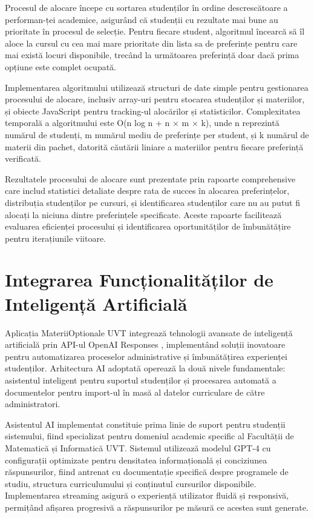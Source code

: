 \documentclass[12pt,a4paper]{report}
\begin{document}
Procesul de alocare începe cu sortarea studenților în ordine descrescătoare a performan-ței academice, asigurând că studenții cu rezultate mai bune au prioritate în procesul de selecție. Pentru fiecare student, algoritmul încearcă să îl aloce la cursul cu cea mai mare prioritate din lista sa de preferințe pentru care mai există locuri disponibile, trecând la următoarea preferință doar dacă prima opțiune este complet ocupată.

Implementarea algoritmului utilizează structuri de date simple \cite{data-structures} pentru gestionarea procesului de alocare, inclusiv array-uri pentru stocarea studenților și materiilor, și obiecte JavaScript pentru tracking-ul alocărilor și statisticilor. Complexitatea temporală a algoritmului este O(n log n + n × m × k), unde n reprezintă numărul de studenți, m numărul mediu de preferințe per student, și k numărul de materii din pachet, datorită căutării liniare a materiilor pentru fiecare preferință verificată.

Rezultatele procesului de alocare sunt prezentate prin rapoarte comprehensive care includ statistici detaliate despre rata de succes în alocarea preferințelor, distribuția studenților pe cursuri, și identificarea studenților care nu au putut fi alocați la niciuna dintre preferințele specificate. Aceste rapoarte facilitează evaluarea eficienței procesului și identificarea oportunităților de îmbunătățire pentru iterațiunile viitoare.

\section{Integrarea Funcționalităților de Inteligență Artificială}

Aplicația MateriiOptionale UVT integrează tehnologii avansate de inteligență artificială prin API-ul OpenAI Responses \cite{openai-api}, implementând soluții inovatoare pentru automatizarea proceselor administrative și îmbunătățirea experienței studenților. Arhitectura AI adoptată operează la două nivele fundamentale: asistentul inteligent pentru suportul studenților și procesarea automată a documentelor pentru import-ul în masă al datelor curriculare de către administratori.

Asistentul AI implementat constituie prima linie de suport pentru studenții sistemului, fiind specializat pentru domeniul academic specific al Facultății de Matematică și Informatică UVT. Sistemul utilizează modelul GPT-4 cu configurații optimizate pentru densitatea informațională și conciziunea răspunsurilor, fiind antrenat cu documentație specifică despre programele de studiu, structura curriculumului și conținutul cursurilor disponibile. Implementarea streaming asigură o experiență utilizator fluidă și responsivă, permițând afișarea progresivă a răspunsurilor pe măsură ce acestea sunt generate.
\end{document}
